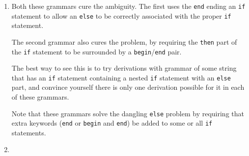 \documentclass[11pt]{article}
\begin{document}
\begin{enumerate}
\begin{enumerate}
\begin{grammar}[1.35]
                  \end{grammar}

          \end{enumerate}

          \medskip

    \item Both these grammars cure the ambiguity.  The first uses the
          \texttt{end} ending an \texttt{if} statement to allow an
          \texttt{else} to be correctly associated with the proper
          \texttt{if} statement.

          The second grammar also cures the problem, by requiring the
          \texttt{then} part of the \texttt{if} statement to be surrounded
          by a \texttt{begin}/\texttt{end} pair.

          The best way to see this is to try derivations with grammar of some
          string that has an \texttt{if} statement containing a nested
          \texttt{if} statement with an \texttt{else} part, and convince
          yourself there is only one derivation possible for it in each of
          these grammars.

          Note that these grammars solve the dangling \texttt{else} problem
          by requiring that extra keywords (\texttt{end} or \texttt{begin}
          and \texttt{end}) be added to some or all \texttt{if} statements.

    \item \begin{enumerate}


\end{enumerate}
\end{enumerate}
\end{document}
